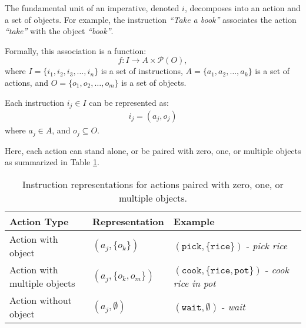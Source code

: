 \documentclass[a4paper,11pt]{lmcs}
\begin{document}
The fundamental unit of an imperative, denoted \(i\), decomposes into an action and a set of objects. For example, the instruction \emph{``Take a book''} associates the action \emph{``take''} with the object \emph{``book''}.

Formally, this association is a function:
\[
f : I \to A \times \mathcal{P}(O),
\]
where \(I = \{ i_1, i_2, i_3, \ldots, i_n \}\) is a set of instructions,
\(A = \{ a_1, a_2, \ldots, a_k \}\) is a set of actions, and
\(O = \{ o_1, o_2, \ldots, o_m \}\) is a set of objects.

Each instruction \(i_j \in I\) can be represented as:
\begin{eqnarray}
\label{eq:ac_ob}
i_j = (a_j, o_j)
\end{eqnarray}
where \(a_j \in A\), and \(o_j \subseteq O\).

Here, each action can stand alone, or be paired with zero, one, or multiple objects as summarized in Table \ref{tab:ac_ob}.

\begin{table}[h!]
\label{tab:ac_ob}
\centering
\begin{tabular}{|l|l|l|}
\hline
\textbf{Action Type}           & \textbf{Representation}             & \textbf{Example}                \\
\hline
Action with object             & \((a_j, \{ o_k \})\)                & \((\texttt{pick}, \{\texttt{rice}\})\) - \emph{pick rice} \\
\hline
Action with multiple objects   & \((a_j, \{ o_k, o_m \})\)          & \((\texttt{cook}, \{\texttt{rice}, \texttt{pot}\})\) - \emph{cook rice in pot} \\
\hline
Action without object          & \((a_j, \emptyset)\)                & \((\texttt{wait}, \emptyset)\) - \emph{wait} \\
\hline
\end{tabular}
\caption{Instruction representations for actions paired with zero, one, or multiple objects.}
\end{table}
\end{document}

